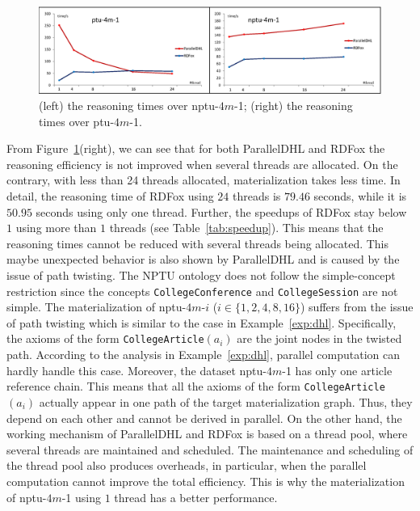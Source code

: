 \begin{figure}[htbp]
\begin{center}
\includegraphics[width=1\textwidth]{fig-diff-threads.eps}
\caption{(left) the reasoning times over nptu-$4m$-1; (right) the reasoning times over ptu-$4m$-1.}
\label{fig:diffthreads}
\end{center}
\end{figure}

From Figure~\ref{fig:diffthreads}(right),
we can see that for both ParallelDHL and RDFox the reasoning efficiency is not
improved when several threads are allocated. On the contrary, with less than 24 threads allocated,
materialization takes less time. In detail,
the reasoning time of RDFox using $24$ threads
is $79.46$ seconds, while it is $50.95$ seconds using only one thread.
Further, the speedups of RDFox stay below $1$ using more than $1$ threads (see Table~\ref{tab:speedup}).
This means that the reasoning times cannot be reduced with several threads being
allocated.
This maybe unexpected behavior is also shown by ParallelDHL and is caused by the issue of path twisting.
The NPTU ontology does not follow the simple-concept restriction since
the concepts \texttt{CollegeConference} and \texttt{CollegeSession} are not simple.
The materialization of nptu-$4m$-$i$ ($i\in\{1,2,4,8,16\}$) suffers from the issue
of path twisting which is similar to the case in Example~\ref{exp:dhl}.
Specifically, the axioms of the form \texttt{CollegeArticle}$(a_i)$ are
the joint nodes in the twisted path.
According to the analysis in Example~\ref{exp:dhl}, parallel computation can hardly
handle this case. Moreover, the dataset nptu-$4m$-1 has only one
article reference chain. This means that all
the axioms of the form \texttt{CollegeArticle}$(a_i)$ actually
appear in one path of the target materialization graph.
Thus, they depend on each other and cannot be derived in parallel.
On the other hand, the working mechanism of ParallelDHL and RDFox is based on
a thread pool, where several threads are maintained and scheduled.
The maintenance and scheduling of the thread pool also produces
overheads, in particular, when the parallel computation
cannot improve the total efficiency.
This is why the materialization of nptu-$4m$-1 using $1$
thread has a better performance.


